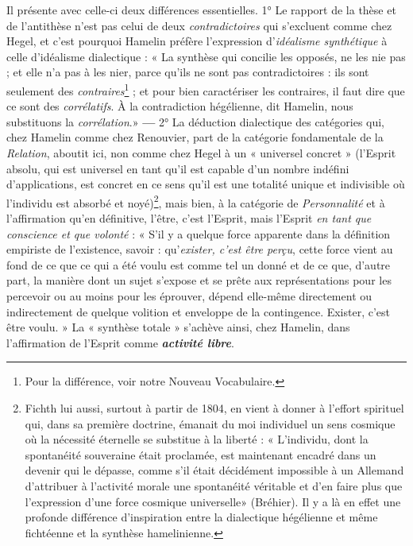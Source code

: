 Il présente avec celle-ci deux différences essentielles. 1° Le rapport de
la thèse et de l’antithèse n’est pas celui de deux {\it contradictoires} qui s’excluent
comme chez Hegel, et c’est pourquoi Hamelin préfère l’expression d'\textsf{\textit {idéalisme
synthétique}} à celle d’idéalisme dialectique : « La synthèse qui concilie
les opposés, ne les nie pas ; et elle n’a pas à les nier, parce qu’ils ne sont pas
contradictoires : ils sont seulement des {\it contraires}\footnote{Pour la différence, voir notre Nouveau Vocabulaire.} ; et pour bien caractériser
les contraires, il faut dire que ce sont des {\it corrélatifs}. À la contradiction
hégélienne, dit Hamelin, nous substituons la {\it corrélation}.» {\bf —} 2° La déduction
dialectique des catégories qui, chez Hamelin comme chez Renouvier,
part de la catégorie fondamentale de la {\it Relation}, aboutit ici, non comme
chez Hegel à un « universel concret » (l'Esprit absolu, qui est universel en
tant qu’il est capable d’un nombre indéfini d'applications, est concret en
ce sens qu'il est une totalité unique et indivisible où l’individu est absorbé
et noyé)\footnote{Fichth lui aussi, surtout à partir de 1804, en vient à donner à l'effort spirituel qui,
dans sa première doctrine, émanait du moi individuel un sens cosmique où la nécessité
éternelle se substitue à la liberté : « L'individu, dont la spontanéité souveraine était
proclamée, est maintenant encadré dans un devenir qui le dépasse, comme s'il était
décidément impossible à un Allemand d’attribuer à l’activité morale une spontanéité
véritable et d'en faire plus que l'expression d’une force cosmique universelle» (Bréhier).
Il y a là en effet une profonde différence d'inspiration entre la dialectique hégélienne et
même fichtéenne et la synthèse hamelinienne.}, mais bien, à la catégorie de {\it Personnalité} et à l'affirmation qu’en
définitive, l'être, c’est l'Esprit, mais l'Esprit {\it en tant que conscience et que
volonté} : « S'il y a quelque force apparente dans la définition empiriste de
l'existence, savoir : qu’{\it exister, c’est être perçu}, cette force vient au fond de
ce que ce qui a été voulu est comme tel un donné et de ce que, d'autre
part, la manière dont un sujet s'expose et se prête aux représentations pour
les percevoir ou au moins pour les éprouver, dépend elle-même directement
ou indirectement de quelque volition et enveloppe de la contingence.
Exister, c’est être voulu. »
La « synthèse totale » s’achève ainsi, chez Hamelin, dans l’affirmation
de l'Esprit comme \textbf{\textit {activité libre}}.

